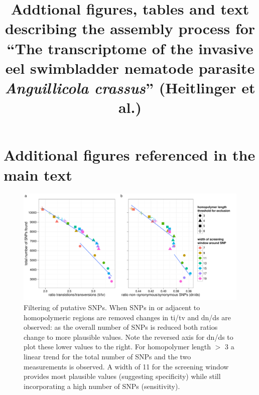 \documentclass[12pt,a4paper]{article}
\date{}
\begin{document}
\title{Addtional figures, tables and text describing the assembly
  process for ``The transcriptome of the invasive eel swimbladder
  nematode parasite \textit{Anguillicola crassus}'' (Heitlinger et
  al.)}

\maketitle
\tableofcontents
\listoffigures 
\listoftables


\renewcommand{\figurename}{Additional Figure}
\renewcommand{\tablename}{Additional Table}

\section{Additional figures referenced in the main text}

\newpage
\clearpage

\begin{figure}
  \centering
\includegraphics{../figures/Additional_Figure_1.pdf}
\caption[Filtering of putative SNPs]{Filtering of putative SNPs. When
  SNPs in or adjacent to homopolymeric regions are removed changes in
  ti/tv and dn/ds are observed: as the overall number of SNPs is
  reduced both ratios change to more plausible values. Note the
  reversed axis for dn/ds to plot these lower values to the right. For
  homopolymer length $>$ 3 a linear trend for the total number of SNPs
  and the two measurements is observed. A width of 11 for the
  screening window provides most plausible values (suggesting
  specificity) while still incorporating a high number of SNPs
  (sensitivity).}
\end{figure}

\newpage
\clearpage
\end{document}
